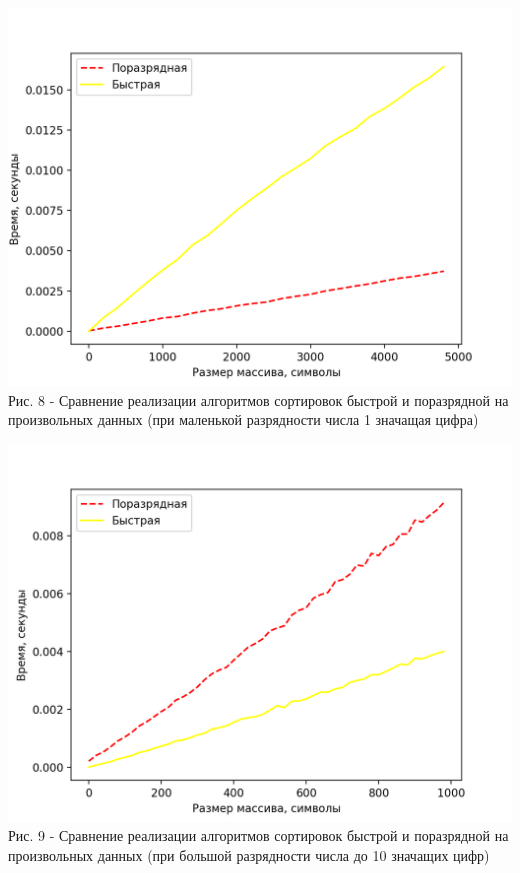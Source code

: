 \documentclass[a4paper,14pt]{article} %
\begin{document}
	\begin{center}
        		\includegraphics[scale = 1]{graph3} \\ Рис. 8 - Сравнение реализации алгоритмов сортировок быстрой и поразрядной на произвольных данных (при маленькой разрядности числа 1 значащая цифра)
	\end{center}
	
	\begin{center}
        		\includegraphics[scale = 1]{graph4} \\ Рис. 9 - Сравнение реализации алгоритмов сортировок быстрой и поразрядной на произвольных данных (при большой разрядности числа до 10 значащих цифр)
	\end{center}
	
\end{document}
